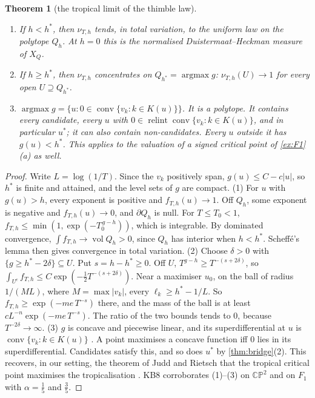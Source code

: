 \documentclass[11pt]{article}
\newtheorem{theorem}{Theorem}\newtheorem{proposition}[theorem]{Proposition}\newtheorem{lemma}[theorem]{Lemma}\newtheorem{corollary}[theorem]{Corollary}\newtheorem{conjecture}[theorem]{Conjecture}\crefname{conjecture}{Conjecture}{Conjectures}
\theoremstyle{definition}\newtheorem{definition}[theorem]{Definition}\newtheorem{remark}[theorem]{Remark}\newtheorem{example}[theorem]{Example}\newtheorem{problem}[theorem]{Open problem}\crefname{problem}{Problem}{Problems}
\begin{document}
\begin{theorem}[the tropical limit of the thimble law]\label{thm:tropical}
\begin{enumerate}
\item[(1)] If $h<h^*$, then $\nu_{T,h}$ tends, in total variation, to the uniform law on the polytope $Q_h$. At $h=0$ this is the normalised
  Duistermaat--Heckman measure of $X_Q$.
\item[(2)] If $h\ge h^*$, then $\nu_{T,h}$ concentrates on $Q_{h^*}=\operatorname{argmax}g$: $\nu_{T,h}(U)\to1$ for every open $U\supseteq Q_{h^*}$.
\item[(3)] $\operatorname{argmax}g=\{u:0\in\operatorname{conv}\{v_k:k\in K(u)\}\}$. It is a polytope. It contains every candidate, every $u$ with $0\in\operatorname{relint}\operatorname{conv}\{v_k:k\in K(u)\}$, and
  in particular $u^*$; it can also contain non-candidates. Every $u$ outside it has $g(u)<h^*$. This applies to the valuation of a signed critical point of
  \cref{ex:F1}(a) as well.
\end{enumerate}
\end{theorem}

\begin{proof}
Write $L=\log(1/T)$. Since the $v_k$ positively span, $g(u)\le C-c|u|$, so $h^*$ is finite and attained, and the level sets of $g$ are compact.
(1) For $u$ with $g(u)>h$, every exponent is positive and $f_{T,h}(u)\to1$. Off $Q_h$, some exponent is negative and $f_{T,h}(u)\to0$, and $\partial Q_h$ is null. For $T\le T_0<1$,
$f_{T,h}\le\min(1,\exp(-T_0^{\,g-h}))$, which is integrable. By dominated convergence, $\int f_{T,h}\to\operatorname{vol}Q_h>0$, since $Q_h$ has interior when $h<h^*$. Scheff\'e's lemma then gives
convergence in total variation.
(2) Choose $\delta>0$ with $\{g\ge h^*-2\delta\}\subseteq U$. Put $s=h-h^*\ge0$. Off $U$, $T^{g-h}\ge T^{-(s+2\delta)}$, so $\int_{U^c}f_{T,h}\le C\exp(-\tfrac12T^{-(s+2\delta)})$. Near a
maximiser $u_0$, on the ball of radius $1/(ML)$, where $M=\max|v_k|$, every $\ell_k\ge h^*-1/L$. So $f_{T,h}\ge\exp(-me\,T^{-s})$ there, and the mass of the ball is at least
$cL^{-n}\exp(-me\,T^{-s})$. The ratio of the two bounds tends to $0$, because $T^{-2\delta}\to\infty$.
(3) $g$ is concave and piecewise linear, and its superdifferential at $u$ is $\operatorname{conv}\{v_k:k\in K(u)\}$ \cite[Theorem~23.8]{Rockafellar1970}. A point maximises a concave function iff
$0$ lies in its superdifferential. Candidates satisfy this, and so does $u^*$ by \cref{thm:bridge}(2). This recovers, in our setting, the theorem
of Judd and Rietsch that the tropical critical point maximises the tropicalisation \cite[Thm.~1.2]{JuddRietsch2019}. KB8 corroborates (1)--(3) on $\mathbb{CP}^2$ and
on $F_1$ with $\alpha=\tfrac15$ and $\tfrac35$.
\end{proof}
\end{document}
